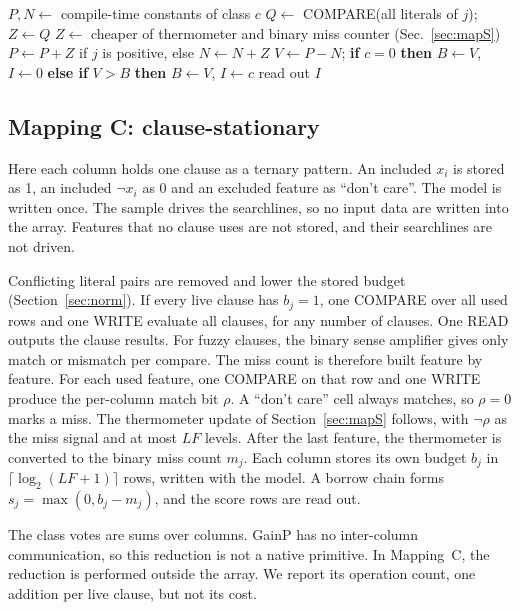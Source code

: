 \documentclass[preprint,review,12pt]{elsarticle}
\newcommand{\gainp}{GainP}
\newcommand{\hyp}[1]{#1}   %
\newcommand{\LF}{\mathit{LF}}
\begin{document}
\begin{algorithm}[t]
\caption{Sample-stationary FPTM program (broadcast to all columns).}
\label{alg:mapS}
\begin{algorithmic}[1]
  \State $P,N \gets$ compile-time constants of class $c$
     \State $Q\gets$ COMPARE(all literals of $j$); $Z\gets Q$
    \Else \State $Z\gets$ cheaper of thermometer and binary miss counter (Sec.~\ref{sec:mapS})
    \EndIf
    \State $P\gets P+Z$ if $j$ is positive, else $N\gets N+Z$
  \EndFor
  \State $V\gets P-N$; \textbf{if} $c=0$ \textbf{then} $B\gets V$, $I\gets0$ \textbf{else if} $V>B$ \textbf{then} $B\gets V$, $I\gets c$
\EndFor
\State read out $I$
\end{algorithmic}
\end{algorithm}

\subsection{Mapping C: clause-stationary}\label{sec:mapC}
Here each column holds one clause as a ternary pattern.
An included $x_i$ is stored as 1, an included $\lnot x_i$ as 0 and an excluded feature as ``don't care''.
The model is written once. The sample drives the searchlines, so no input data are written into the array.
Features that no clause uses are not stored, and their searchlines are not driven.

Conflicting literal pairs are removed and lower the stored budget (Section~\ref{sec:norm}).
If every live clause has $b_j=1$, one COMPARE over all used rows and one WRITE evaluate all clauses, for any number of clauses. One READ outputs the clause results.
For fuzzy clauses, the binary sense amplifier gives only match or mismatch per compare.
The miss count is therefore built feature by feature.
For each used feature, one COMPARE on that row and one WRITE produce the per-column match bit $\rho$.
A ``don't care'' cell always matches, so $\rho=0$ marks a miss.
The thermometer update of Section~\ref{sec:mapS} follows, with $\lnot\rho$ as the miss signal and at most $\LF$ levels.
After the last feature, the thermometer is converted to the binary miss count $m_j$.
Each column stores its own budget $b_j$ in $\lceil\log_2(\LF+1)\rceil$ rows, written with the model.
A borrow chain forms $s_j=\max(0,b_j-m_j)$, and the score rows are read out.

The class votes are sums over columns.
\gainp{} has no inter-column communication, so this reduction is not a native primitive.
\hyp{In Mapping~C, the reduction is performed outside the array. We report its operation count, one addition per live clause, but not its cost.}
\end{document}
